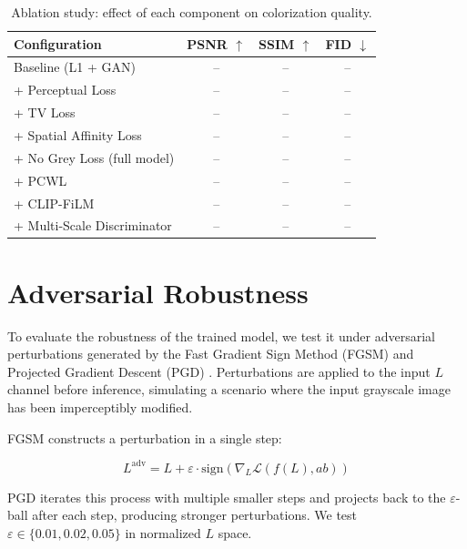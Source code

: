 \documentclass[12pt, a4paper, oneside]{report}
\begin{document}
\begin{table}[H]
    \centering
    \caption{Ablation study: effect of each component on colorization quality.}
    \begin{tabular}{lccc}
        \toprule
        \textbf{Configuration} & \textbf{PSNR} $\uparrow$ & \textbf{SSIM} $\uparrow$ & \textbf{FID} $\downarrow$ \\
        \midrule
        Baseline (L1 + GAN)              & -- & -- & -- \\
        + Perceptual Loss                & -- & -- & -- \\
        + TV Loss                        & -- & -- & -- \\
        + Spatial Affinity Loss          & -- & -- & -- \\
        + No Grey Loss (full model)      & -- & -- & -- \\
        + PCWL                           & -- & -- & -- \\
        + CLIP-FiLM                      & -- & -- & -- \\
        + Multi-Scale Discriminator      & -- & -- & -- \\
        \bottomrule
    \end{tabular}
    \label{tab:ablation}
\end{table}

\section{Adversarial Robustness}

To evaluate the robustness of the trained model, we test it under adversarial
perturbations generated by the Fast Gradient Sign Method (FGSM)
\cite{goodfellow2014explaining} and Projected Gradient Descent (PGD)
\cite{madry2018towards}. Perturbations are applied to the input $L$ channel before
inference, simulating a scenario where the input grayscale image has been
imperceptibly modified.

FGSM constructs a perturbation in a single step:

\begin{equation}
    L^{\text{adv}} = L + \varepsilon \cdot \text{sign}(\nabla_L \mathcal{L}(f(L), ab))
\end{equation}

PGD iterates this process with multiple smaller steps and projects back to the
$\varepsilon$-ball after each step, producing stronger perturbations. We test
$\varepsilon \in \{0.01, 0.02, 0.05\}$ in normalized $L$ space.
\end{document}
